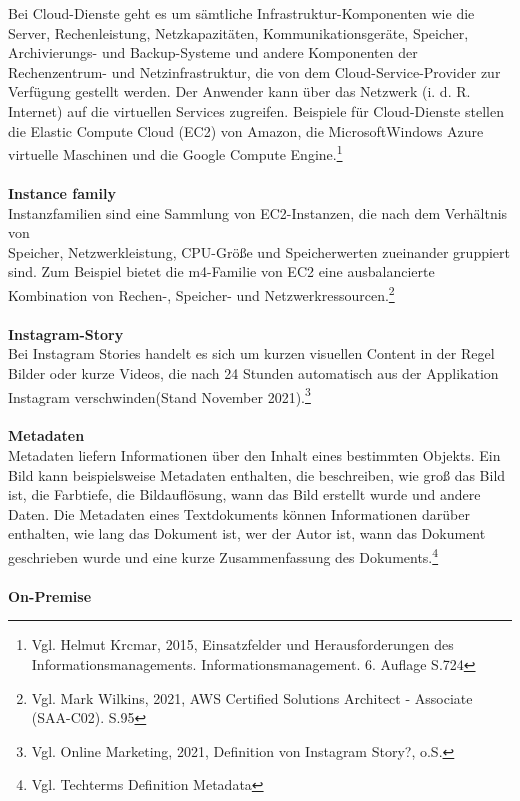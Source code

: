 Bei Cloud-Dienste geht es um sämtliche
Infrastruktur-Komponenten wie die Server, Rechenleistung, Netzkapazitäten, Kommunikationsgeräte, Speicher, Archivierungs- und Backup-Systeme und andere Komponenten der Rechenzentrum- und Netzinfrastruktur, die von dem Cloud-Service-Provider zur Verfügung gestellt werden. Der Anwender kann über das Netzwerk (i. d. R. Internet) auf die virtuellen Services zugreifen. Beispiele für Cloud-Dienste stellen die Elastic Compute Cloud (EC2) von Amazon, die MicrosoftWindows Azure virtuelle Maschinen und die Google Compute Engine.\footnote{Vgl. Helmut Krcmar, 2015, Einsatzfelder und Herausforderungen des Informationsmanagements. Informationsmanagement. 6. Auflage S.724\cite{IM1}}
\\\\
\textbf{Instance family}\\
Instanzfamilien sind eine Sammlung von EC2-Instanzen, die nach dem Verhältnis von\\ Speicher, Netzwerkleistung, CPU-Größe und Speicherwerten zueinander gruppiert sind. Zum Beispiel bietet die m4-Familie von EC2 eine ausbalancierte Kombination von Rechen-, Speicher- und Netzwerkressourcen.\footnote{Vgl. Mark Wilkins, 2021, AWS Certified Solutions Architect - Associate (SAA-C02). S.95\cite{AWS1}}
\\\\
\textbf{Instagram-Story}\\
Bei Instagram Stories handelt es sich um kurzen visuellen Content in der Regel Bilder oder kurze Videos, die nach 24 Stunden automatisch aus der Applikation Instagram verschwinden(Stand November 2021).\footnote{Vgl. Online Marketing, 2021, Definition von Instagram Story?, o.S.\cite{IG2}}
\\\\
\textbf{Metadaten}\\
Metadaten liefern Informationen über den Inhalt eines bestimmten Objekts. Ein Bild kann beispielsweise Metadaten enthalten, die beschreiben, wie groß das Bild ist, die Farbtiefe, die Bildauflösung, wann das Bild erstellt wurde und andere Daten. Die Metadaten eines Textdokuments können Informationen darüber enthalten, wie lang das Dokument ist, wer der Autor ist, wann das Dokument geschrieben wurde und eine kurze Zusammenfassung des Dokuments.\footnote{Vgl. Techterms Definition Metadata\cite{MET}}
\\\\
\textbf{On-Premise}\\
